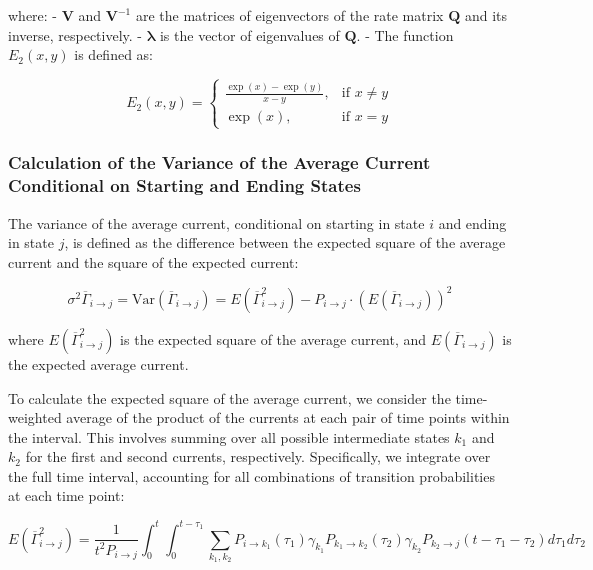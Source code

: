 \documentclass[pdflatex,sn-mathphys-num]{sn-jnl}%
\theoremstyle{thmstyleone}%
\theoremstyle{thmstyletwo}%
\theoremstyle{thmstylethree}%
\begin{document}
where:
- \( \mathbf{V} \) and \( \mathbf{V}^{-1} \) are the matrices of eigenvectors of the rate matrix \( \mathbf{Q} \) and its inverse, respectively.
- \( \boldsymbol{\lambda} \) is the vector of eigenvalues of \( \mathbf{Q} \).
- The function \( E_2(x, y) \) is defined as:

\begin{equation}
	E_2(x, y) = 
	\begin{cases}
		\frac{\exp(x) - \exp(y)}{x - y}, & \text{if } x \neq y \\
		\exp(x), & \text{if } x = y
	\end{cases}
    \label{eq:E_2}
\end{equation}


\subsubsection{Calculation of the Variance of the Average Current Conditional on Starting and Ending States}

The variance of the average current, conditional on starting in state \(i\) and ending in state \(j\), is defined as the difference between the expected square of the average current and the square of the expected current:

\begin{equation}
	\sigma^2 \overline{\Gamma}_{i \rightarrow j}=\text{Var}(\overline{\Gamma}_{i \rightarrow j}) = E(\overline{\Gamma}_{i \rightarrow j}^2) - P_{i \rightarrow j} \cdot \left( E(\overline{\Gamma}_{i \rightarrow j}) \right)^2
    \label{eq:sigma_gamma_expression}
\end{equation}

where \( E(\overline{\Gamma}_{i \rightarrow j}^2) \) is the expected square of the average current, and \( E(\overline{\Gamma}_{i \rightarrow j}) \) is the expected average current.


To calculate the expected square of the average current, we consider the time-weighted average of the product of the currents at each pair of time points within the interval. This involves summing over all possible intermediate states \(k_1\) and \(k_2\) for the first and second currents, respectively. Specifically, we integrate over the full time interval, accounting for all combinations of transition probabilities at each time point:

\begin{equation}
	E(\overline{\Gamma}_{i \rightarrow j}^2) = \frac{1}{t^2 P_{i \rightarrow j}} \int_0^t \int_0^{t-\tau_1} \sum_{k_1, k_2} P_{i \rightarrow k_1}(\tau_1) \gamma_{k_1} P_{k_1 \rightarrow k_2}(\tau_2) \gamma_{k_2} P_{k_2 \rightarrow j}(t-\tau_1-\tau_2) d\tau_1 d\tau_2
    \label{eq:sqr_gamma_integral}
\end{equation}
\end{document}
